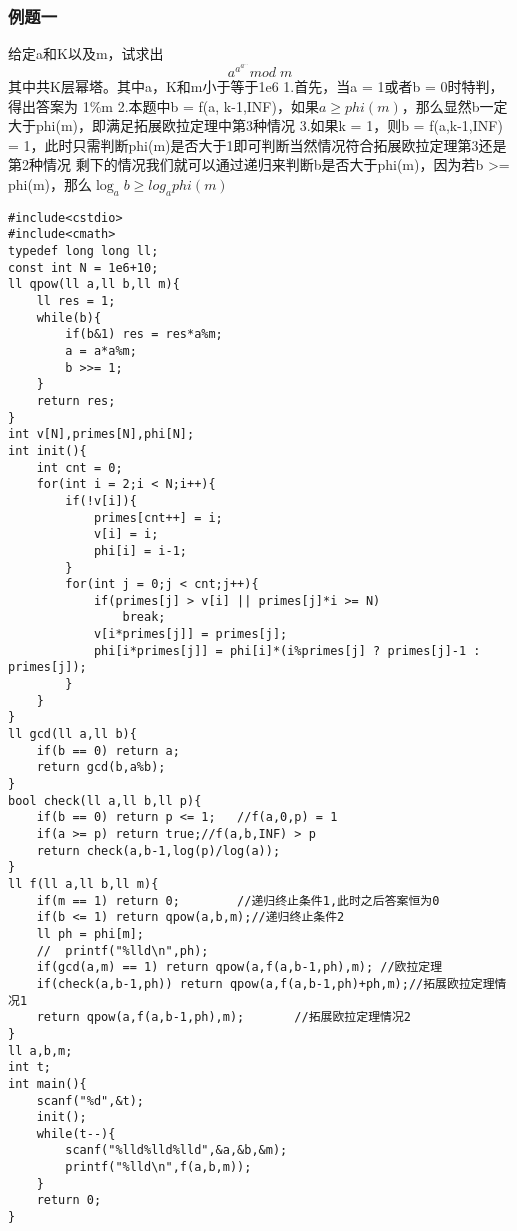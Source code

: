 \subsubsection{例题一}
给定a和K以及m，试求出
$$
a^{a^{a^{\cdots}}}mod\;m
$$
其中共K层幂塔。其中a，K和m小于等于1e6
\newline
1.首先，当a = 1或者b = 0时特判，得出答案为 1\%m
\newline
2.本题中b = f(a, k-1,INF)，如果$ a \ge phi(m) $，那么显然b一定大于phi(m)，即满足拓展欧拉定理中第3种情况
\newline
3.如果k = 1，则b = f(a,k-1,INF) = 1，此时只需判断phi(m)是否大于1即可判断当然情况符合拓展欧拉定理第3还是第2种情况
\newline
剩下的情况我们就可以通过递归来判断b是否大于phi(m)，因为若b >= phi(m)，那么$ \log_ab\ge log_a{phi(m)} $
\newline
\begin{lstlisting}
#include<cstdio>
#include<cmath>
typedef long long ll;
const int N = 1e6+10;
ll qpow(ll a,ll b,ll m){
	ll res = 1;
	while(b){
		if(b&1) res = res*a%m;
		a = a*a%m;
		b >>= 1;
	}
	return res;
}
int v[N],primes[N],phi[N];
int init(){
	int cnt = 0;
	for(int i = 2;i < N;i++){
		if(!v[i]){
			primes[cnt++] = i;
			v[i] = i;
			phi[i] = i-1;
		}
		for(int j = 0;j < cnt;j++){
			if(primes[j] > v[i] || primes[j]*i >= N)
				break;
			v[i*primes[j]] = primes[j];
			phi[i*primes[j]] = phi[i]*(i%primes[j] ? primes[j]-1 : primes[j]);
		}
	}
}
ll gcd(ll a,ll b){
	if(b == 0) return a;
	return gcd(b,a%b);
}
bool check(ll a,ll b,ll p){
	if(b == 0) return p <= 1;	//f(a,0,p) = 1
	if(a >= p) return true;//f(a,b,INF) > p
	return check(a,b-1,log(p)/log(a)); 
}
ll f(ll a,ll b,ll m){
	if(m == 1) return 0;		//递归终止条件1,此时之后答案恒为0 
	if(b <= 1) return qpow(a,b,m);//递归终止条件2 
	ll ph = phi[m];
	//	printf("%lld\n",ph);
	if(gcd(a,m) == 1) return qpow(a,f(a,b-1,ph),m);	//欧拉定理 
	if(check(a,b-1,ph)) return qpow(a,f(a,b-1,ph)+ph,m);//拓展欧拉定理情况1 
	return qpow(a,f(a,b-1,ph),m); 		//拓展欧拉定理情况2 
}
ll a,b,m;
int t;
int main(){
	scanf("%d",&t);
	init();
	while(t--){
		scanf("%lld%lld%lld",&a,&b,&m);
		printf("%lld\n",f(a,b,m));
	}
	return 0;
}
\end{lstlisting}

